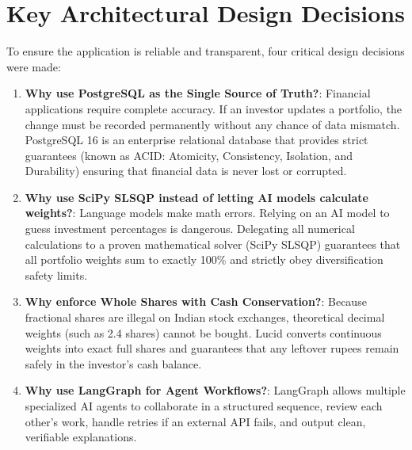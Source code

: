 \section{Key Architectural Design Decisions}
To ensure the application is reliable and transparent, four critical design decisions were made:
\begin{enumerate}
    \item \textbf{Why use PostgreSQL as the Single Source of Truth?}: Financial applications require complete accuracy. If an investor updates a portfolio, the change must be recorded permanently without any chance of data mismatch. PostgreSQL 16 is an enterprise relational database that provides strict guarantees (known as ACID: Atomicity, Consistency, Isolation, and Durability) ensuring that financial data is never lost or corrupted.
    \item \textbf{Why use SciPy SLSQP instead of letting AI models calculate weights?}: Language models make math errors. Relying on an AI model to guess investment percentages is dangerous. Delegating all numerical calculations to a proven mathematical solver (SciPy SLSQP) guarantees that all portfolio weights sum to exactly 100\% and strictly obey diversification safety limits.
    \item \textbf{Why enforce Whole Shares with Cash Conservation?}: Because fractional shares are illegal on Indian stock exchanges, theoretical decimal weights (such as 2.4 shares) cannot be bought. Lucid converts continuous weights into exact full shares and guarantees that any leftover rupees remain safely in the investor's cash balance.
    \item \textbf{Why use LangGraph for Agent Workflows?}: LangGraph allows multiple specialized AI agents to collaborate in a structured sequence, review each other's work, handle retries if an external API fails, and output clean, verifiable explanations.
\end{enumerate}
